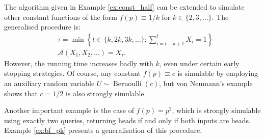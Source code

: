 \documentclass{article}
\theoremstyle{definition}
\newcommand{\Bern}{\operatorname{Bernoulli}}
\newcommand{\A}{\mathcal{A}}
\begin{document}
The algorithm given in Example \ref{ex:const_half} can be extended to simulate other constant functions of the form $f(p)\equiv 1/k$ for $k\in \{2,3,\dots\}$. The generalised procedure is:
\begin{align*}
& \tau = \min\left\{ t \in \{k,2k,3k,\dots\} : \sum_{i=t-k+1}^t X_{i} = 1 \right\} \\
& \A(X_1,X_2,\dots) = X_\tau.
\end{align*}
However, the running time increases badly with $k$, even under certain early stopping strategies.
Of course, any constant $f(p)\equiv c$ is simulable by employing an auxiliary random variable $U\sim \Bern(c)$, but von Neumann's example shows that $c=1/2$ is also strongly simulable.

Another important example is the case of $f(p)=p^2$, which is strongly simulable using exactly two queries, returning heads if and only if both inputs are heads. Example \ref{ex:bf_pk} presents a generalisation of this procedure.
\end{document}
